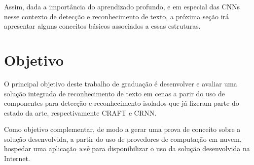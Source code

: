 Assim, dada a importância do aprendizado profundo, e em especial das CNNs nesse contexto de detecção e reconhecimento de texto, a próxima seção irá 
apresentar alguns conceitos básicos associados a essas estruturas.

\section{Objetivo}

O principal objetivo deste trabalho de graduação é desenvolver e avaliar uma solução integrada de reconhecimento de texto em cenas a parir do uso de 
componentes para detecção e reconhecimento isolados que já fizeram parte do estado da arte, respectivamente CRAFT e CRNN.

Como objetivo complementar, de modo a gerar uma prova de conceito sobre a solução desenvolvida, a partir do uso de provedores de computação em nuvem, 
hospedar uma aplicação \textit{web} para disponibilizar o uso da solução desenvolvida na Internet.
